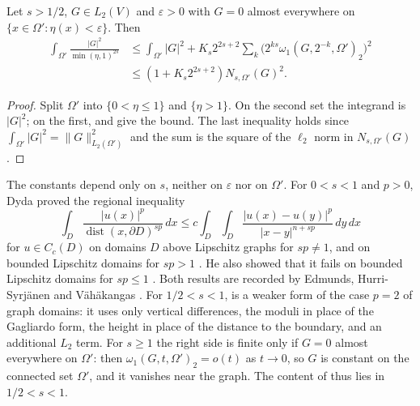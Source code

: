 \begin{theorem}
\label{thm:graph-hardy}
\leanok
{}
Let $s > 1/2$, $G \in L_2(V)$ and $\varepsilon > 0$ with $G = 0$ almost everywhere on
$\{x \in \Omega' : \eta(x) < \varepsilon\}$. Then
\begin{align*}
  \int_{\Omega'} \frac{|G|^2}{\min(\eta, 1)^{2s}} &\leq \int_{\Omega'} |G|^2
  + K_s 2^{2s+2} \sum_k \bigl(2^{ks} \omega_1(G, 2^{-k}, \Omega')_2\bigr)^2 \\
  &\leq (1 + K_s 2^{2s+2}) N_{s,\Omega'}(G)^2 .
\end{align*}
\end{theorem}

\begin{proof}
\leanok
{}
Split $\Omega'$ into $\{0 < \eta \leq 1\}$ and $\{\eta > 1\}$. On the second set the integrand is
$|G|^2$; on the first,  and  give the
bound. The last inequality holds since $\int_{\Omega'} |G|^2 = \|G\|_{L_2(\Omega')}^2$ and the
sum is the square of the $\ell_2$ norm in $N_{s,\Omega'}(G)$.
\end{proof}

The constants depend only on $s$, neither on $\varepsilon$ nor on $\Omega'$. For $0 < s < 1$ and
$p > 0$, Dyda proved the regional inequality
\[
  \int_D \frac{|u(x)|^p}{\operatorname{dist}(x, \partial D)^{sp}} \, dx
  \leq c \int_D \int_D \frac{|u(x) - u(y)|^p}{|x - y|^{n+sp}} \, dy \, dx
\]
for $u \in C_c(D)$ on domains $D$ above Lipschitz graphs for $sp \neq 1$, and on bounded
Lipschitz domains for $sp > 1$ \cite[Theorem 1.1]{Dyda2004}. He also showed that it fails on
bounded Lipschitz domains for $sp \leq 1$ \cite{Dyda2004}. Both results are recorded by Edmunds,
Hurri-Syrjänen and Vähäkangas \cite[Section 1]{EdmundsHurriSyrjanenVahakangas2014}. For
$1/2 < s < 1$,  is a weaker form of the case $p = 2$ of graph domains: it
uses only vertical differences, the moduli in place of the Gagliardo form, the height in place of
the distance to the boundary, and an additional $L_2$ term. For $s \geq 1$ the right side is finite
only if $G = 0$ almost everywhere on $\Omega'$: then $\omega_1(G, t, \Omega')_2 = o(t)$ as
$t \to 0$, so $G$ is constant on the connected set $\Omega'$, and it vanishes near the graph. The
content of  thus lies in $1/2 < s < 1$.

